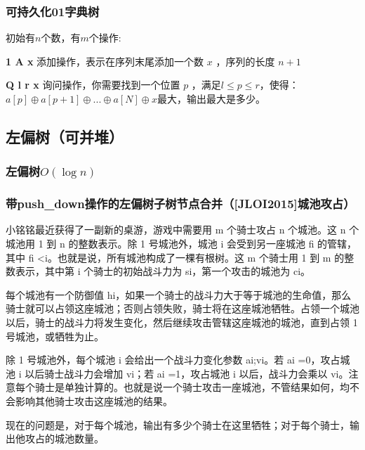 \documentclass[twoside,a4paper]{article}
\begin{document}
\subsubsection{可持久化01字典树}
初始有$n$个数，有$m$个操作:\par
\textbf{1 A x} 添加操作，表示在序列末尾添加一个数 $x$ ，序列的长度 $n+1$\par
\textbf{Q l r x} 询问操作，你需要找到一个位置 $p$ ，满足$l \le p \le r$，使得：$ a[p] \oplus a[p+1] \oplus ... \oplus a[N] \oplus x$最大，输出最大是多少。




\subsection{左偏树（可并堆）}

\subsubsection{左偏树$O(\log n)$}


\subsubsection{带push\_down操作的左偏树子树节点合并（[JLOI2015]城池攻占）}
小铭铭最近获得了一副新的桌游，游戏中需要用 m 个骑士攻占 n 个城池。这 n 个城池用 1 到 n 的整数表示。除 1 号城池外，城池 i 会受到另一座城池 fi 的管辖，其中 fi <i。也就是说，所有城池构成了一棵有根树。这 m 个骑士用 1 到 m 的整数表示，其中第 i 个骑士的初始战斗力为 si，第一个攻击的城池为 ci。\par
每个城池有一个防御值 hi，如果一个骑士的战斗力大于等于城池的生命值，那么骑士就可以占领这座城池；否则占领失败，骑士将在这座城池牺牲。占领一个城池以后，骑士的战斗力将发生变化，然后继续攻击管辖这座城池的城池，直到占领 1 号城池，或牺牲为止。\par
除 1 号城池外，每个城池 i 会给出一个战斗力变化参数 ai;vi。若 ai =0，攻占城池 i 以后骑士战斗力会增加 vi；若 ai =1，攻占城池 i 以后，战斗力会乘以 vi。注意每个骑士是单独计算的。也就是说一个骑士攻击一座城池，不管结果如何，均不会影响其他骑士攻击这座城池的结果。\par
现在的问题是，对于每个城池，输出有多少个骑士在这里牺牲；对于每个骑士，输出他攻占的城池数量。\par

\end{document}

